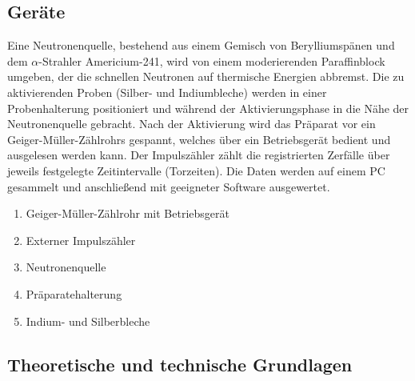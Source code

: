\subsection{Geräte}
Eine Neutronenquelle, bestehend aus einem Gemisch von Berylliumspänen und dem \(\alpha\)-Strahler Americium-241, wird von einem moderierenden Paraffinblock umgeben, der die schnellen Neutronen auf thermische Energien abbremst. Die zu aktivierenden Proben (Silber- und Indiumbleche) werden in einer Probenhalterung positioniert und während der Aktivierungsphase in die Nähe der Neutronenquelle gebracht.
Nach der Aktivierung wird das Präparat vor ein Geiger-Müller-Zählrohrs gespannt, welches über ein Betriebsgerät bedient und ausgelesen werden kann. Der Impulszähler zählt die registrierten Zerfälle über jeweils festgelegte Zeitintervalle (Torzeiten). Die Daten werden auf einem PC gesammelt und anschließend mit geeigneter Software ausgewertet.

\begin{enumerate}
    \item Geiger-Müller-Zählrohr mit Betriebsgerät
    \item Externer Impulszähler
    \item Neutronenquelle
    \item Präparatehalterung
    \item Indium- und Silberbleche
\end{enumerate}

\newpage

\subsection[Theoretische und technische Grundlagen]{Theoretische und technische Grundlagen \protect\autocite{Skript_2.2}}
